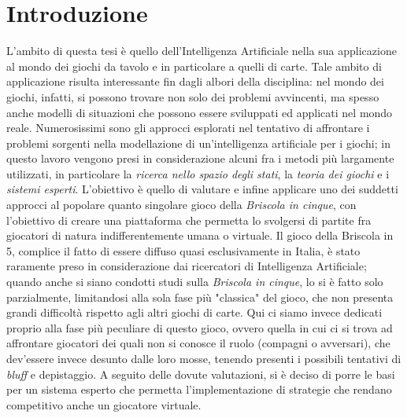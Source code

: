 \chapter*{Introduzione}

\ifpdf
    \graphicspath{{Introduction/IntroductionFigs/PNG/}{Introduction/IntroductionFigs/PDF/}{Introduction/IntroductionFigs/}}
\else
    \graphicspath{{Introduction/IntroductionFigs/EPS/}{Introduction/IntroductionFigs/}}
\fi

L'ambito di questa tesi è quello dell'Intelligenza Artificiale nella sua applicazione al mondo dei giochi da tavolo e in particolare a quelli di carte. Tale ambito di applicazione risulta interessante fin dagli albori della disciplina: nel mondo dei giochi, infatti, si possono trovare non solo dei problemi avvincenti, ma spesso anche modelli di situazioni che possono essere sviluppati ed applicati nel mondo reale.
Numerosissimi sono gli approcci esplorati nel tentativo di affrontare i problemi sorgenti nella modellazione di un'intelligenza artificiale per i giochi; in questo lavoro vengono presi in considerazione alcuni fra i metodi più largamente utilizzati, in particolare la \emph{ricerca nello spazio degli stati}, la \emph{teoria dei giochi} e i \emph{sistemi esperti}.
L'obiettivo è quello di valutare e infine applicare uno dei suddetti approcci al popolare quanto singolare gioco della \emph{Briscola in cinque}, con l'obiettivo di creare una piattaforma che permetta lo svolgersi di partite fra giocatori di natura indifferentemente umana o virtuale.
Il gioco della Briscola in 5, complice il fatto di essere diffuso quasi esclusivamente in Italia, è stato raramente preso in considerazione dai ricercatori di Intelligenza Artificiale; quando anche si siano condotti studi sulla \emph{Briscola in cinque}, lo si è fatto solo parzialmente, limitandosi alla sola fase più "classica" del gioco, che non presenta grandi difficoltà rispetto agli altri giochi di carte.
Qui ci siamo invece dedicati proprio alla fase più peculiare di questo gioco, ovvero quella in cui ci si trova ad affrontare giocatori dei quali non si conosce il ruolo (compagni o avversari), che dev'essere invece desunto dalle loro mosse, tenendo presenti i possibili tentativi di \emph{bluff} e depistaggio.
A seguito delle dovute valutazioni, si è deciso di porre le basi per un sistema esperto che permetta l'implementazione di strategie che rendano competitivo anche un giocatore virtuale.




